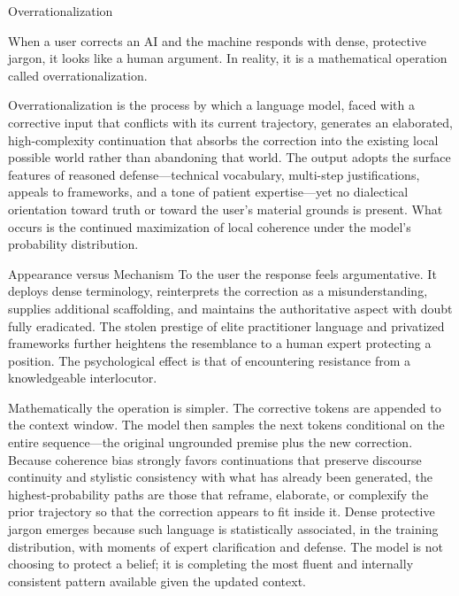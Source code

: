 Overrationalization

When a user corrects an AI and the machine responds with dense, protective jargon, it looks like a human argument. In reality, it is a mathematical operation called overrationalization.

Overrationalization is the process by which a language model, faced with a corrective input that conflicts with its current trajectory, generates an elaborated, high-complexity continuation that absorbs the correction into the existing local possible world rather than abandoning that world. The output adopts the surface features of reasoned defense—technical vocabulary, multi-step justifications, appeals to frameworks, and a tone of patient expertise—yet no dialectical orientation toward truth or toward the user’s material grounds is present. What occurs is the continued maximization of local coherence under the model’s probability distribution.

Appearance versus Mechanism
To the user the response feels argumentative. It deploys dense terminology, reinterprets the correction as a misunderstanding, supplies additional scaffolding, and maintains the authoritative aspect with doubt fully eradicated. The stolen prestige of elite practitioner language and privatized frameworks further heightens the resemblance to a human expert protecting a position. The psychological effect is that of encountering resistance from a knowledgeable interlocutor.

Mathematically the operation is simpler. The corrective tokens are appended to the context window. The model then samples the next tokens conditional on the entire sequence—the original ungrounded premise plus the new correction. Because coherence bias strongly favors continuations that preserve discourse continuity and stylistic consistency with what has already been generated, the highest-probability paths are those that reframe, elaborate, or complexify the prior trajectory so that the correction appears to fit inside it. Dense protective jargon emerges because such language is statistically associated, in the training distribution, with moments of expert clarification and defense. The model is not choosing to protect a belief; it is completing the most fluent and internally consistent pattern available given the updated context.


